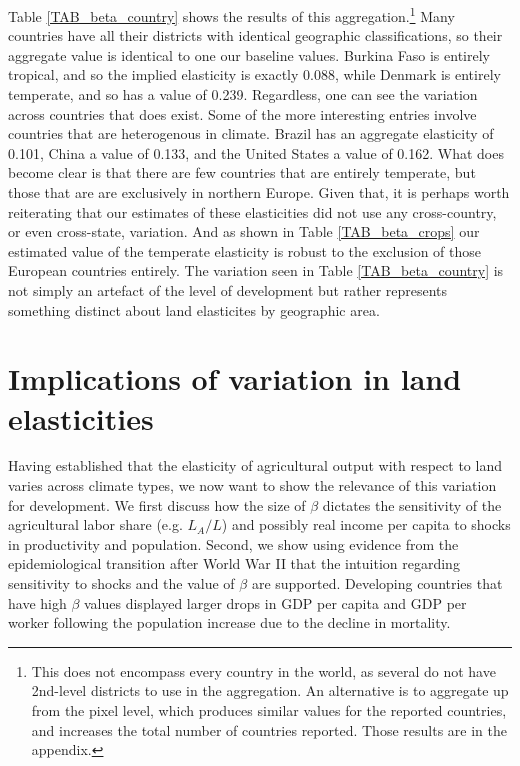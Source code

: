 \documentclass[11pt]{article}
\begin{document}
 Table \ref{TAB_beta_country} shows the results of this aggregation.\footnote{This does not encompass every country in the world, as several do not have 2nd-level districts to use in the aggregation. An alternative is to aggregate up from the pixel level, which produces similar values for the reported countries, and increases the total number of countries reported. Those results are in the appendix.} Many countries have all their districts with identical geographic classifications, so their aggregate value is identical to one our baseline values. Burkina Faso is entirely tropical, and so the implied elasticity is exactly 0.088, while Denmark is entirely temperate, and so has a value of 0.239. Regardless, one can see the variation across countries that does exist. Some of the more interesting entries involve countries that are heterogenous in climate. Brazil has an aggregate elasticity of 0.101, China a value of 0.133, and the United States a value of 0.162. What does become clear is that there are few countries that are entirely temperate, but those that are are exclusively in northern Europe. Given that, it is perhaps worth reiterating that our estimates of these elasticities did not use any cross-country, or even cross-state, variation. And as shown in Table \ref{TAB_beta_crops} our estimated value of the temperate elasticity is robust to the exclusion of those European countries entirely. The variation seen in Table \ref{TAB_beta_country} is not simply an artefact of the level of development but rather represents something distinct about land elasticites by geographic area.

\section{Implications of variation in land elasticities}\label{SEC_implications}
Having established that the elasticity of agricultural output with respect to land varies across climate types, we now want to show the relevance of this variation for development. We first discuss how the size of $\beta$ dictates the sensitivity of the agricultural labor share (e.g. $L_A/L$) and possibly real income per capita to shocks in productivity and population. Second, we show using evidence from the epidemiological transition after World War II that the intuition regarding sensitivity to shocks and the value of $\beta$ are supported. Developing countries that have high $\beta$ values displayed larger drops in GDP per capita and GDP per worker following the population increase due to the decline in mortality.
\end{document}
